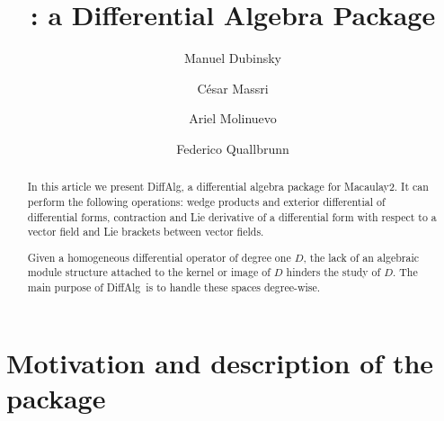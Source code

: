 \documentclass{amsart}
\title{\dA: a Differential Algebra Package}
\author[M. Dubinsky]{Manuel Dubinsky}
\author[C. Massri]{C\'esar Massri}
\author[A. Molinuevo]{Ariel Molinuevo}
\author[F. Quallbrunn]{Federico Quallbrunn}
\theoremstyle{definition}
\def\dA{{\ttfamily DiffAlg}}
\begin{document}
\begin{abstract}
In this article we present \dA, a differential algebra package for Macaulay2. 
It can perform the following operations: wedge products and exterior differential of differential forms, contraction and Lie derivative of a differential form with respect to a vector field and Lie brackets between vector fields.

Given a homogeneous differential operator of degree one $D$, the lack of an algebraic module structure attached to the kernel or image of $D$ hinders the study of $D$. The main purpose of \dA\ is to handle these spaces degree-wise.
\end{abstract}

\maketitle

\section{Motivation and description of the package}

\
\end{document}
